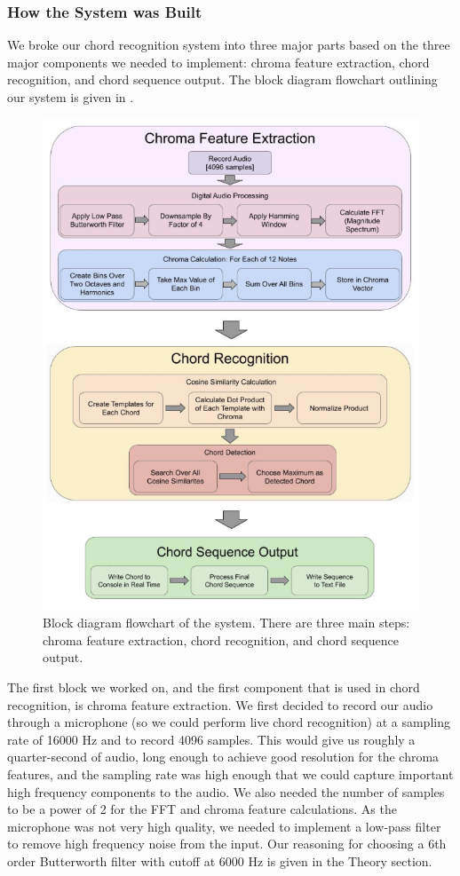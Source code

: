 \documentclass[journal]{IEEEtran}
\begin{document}
\subsubsection{How the System was Built}
We broke our chord recognition system into three major parts based on the three major components we needed to implement: chroma feature extraction, chord recognition, and chord sequence output.
The block diagram flowchart outlining our system is given in .
\begin{figure}[!t]
    \centering
    \includegraphics[width = \linewidth]{../Figures/block_diagram_2}
    \caption{Block diagram flowchart of the system.
    There are three main steps: chroma feature extraction, chord recognition, and chord sequence output.}
    \label{fig:block}
\end{figure}

The first block we worked on, and the first component that is used in chord recognition, is chroma feature extraction.
We first decided to record our audio through a microphone (so we could perform live chord recognition) at a sampling rate of 16000 Hz and to record 4096 samples.
This would give us roughly a quarter-second of audio, long enough to achieve good resolution for the chroma features, and the sampling rate was high enough that we could capture important high frequency components to the audio.
We also needed the number of samples to be a power of 2 for the FFT and chroma feature calculations.
As the microphone was not very high quality, we needed to implement a low-pass filter to remove high frequency noise from the input.
Our reasoning for choosing a 6th order Butterworth filter with cutoff at 6000 Hz is given in the Theory section.
\end{document}
